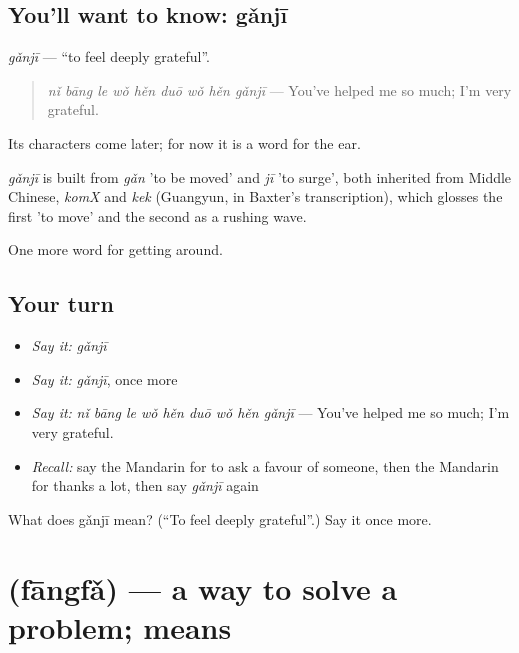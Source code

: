 \subsection*{You'll want to know: gǎnjī}
\emph{gǎnjī} — \textquotedblleft{}to feel deeply grateful\textquotedblright{}.

\begin{quote}
\emph{nǐ bāng le wǒ hěn duō wǒ hěn gǎnjī} — You've helped me so much; I'm very grateful.
\end{quote}

Its characters come later; for now it is a word for the ear.

\begin{cousinweb}
\emph{gǎnjī} is built from \emph{gǎn} 'to be moved' and \emph{jī} 'to surge', both inherited from Middle Chinese, \emph{komX} and \emph{kek} (Guangyun, in Baxter's transcription), which glosses the first 'to move' and the second as a rushing wave.
\end{cousinweb}

\begin{grammarlens}[title={What you've built}]
One more word for getting around.
\end{grammarlens}

\subsection*{Your turn}
\begin{itemize}
\raggedright
  \item \emph{Say it:} \emph{gǎnjī}
  \item \emph{Say it:} \emph{gǎnjī}, once more
  \item \emph{Say it:} \emph{nǐ bāng le wǒ hěn duō wǒ hěn gǎnjī} — You've helped me so much; I'm very grateful.
  \item \emph{Recall:} say the Mandarin for to ask a favour of someone, then the Mandarin for thanks a lot, then say \emph{gǎnjī} again
\end{itemize}

\begin{tcolorbox}[breakable,colback=teal!4,colframe=teal!35!black,title={Before you move on}]
What does gǎnjī mean? (\textquotedblleft{}To feel deeply grateful\textquotedblright{}.) Say it once more.
\end{tcolorbox}
\section[\texorpdfstring{\zh{方法} (fāngfǎ)}{方法 (fāngfǎ)}]{ (fāngfǎ) — a way to solve a problem; means}

